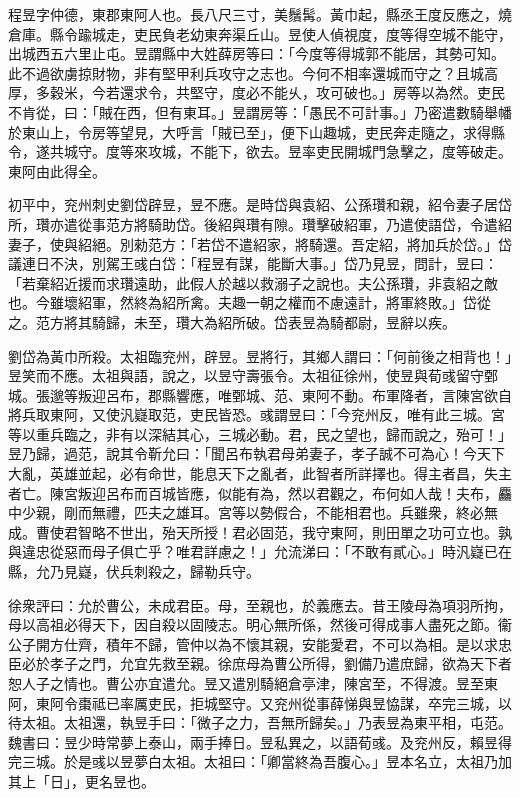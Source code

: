 
\begin{pinyinscope}
程昱字仲德，東郡東阿人也。長八尺三寸，美鬚髯。黃巾起，縣丞王度反應之，燒倉庫。縣令踰城走，吏民負老幼東奔渠丘山。昱使人偵視度，度等得空城不能守，出城西五六里止屯。昱謂縣中大姓薛房等曰：「今度等得城郭不能居，其勢可知。此不過欲虜掠財物，非有堅甲利兵攻守之志也。今何不相率還城而守之？且城高厚，多穀米，今若還求令，共堅守，度必不能乆，攻可破也。」房等以為然。吏民不肯從，曰：「賊在西，但有東耳。」昱謂房等：「愚民不可計事。」乃密遣數騎舉幡於東山上，令房等望見，大呼言「賊已至」，便下山趣城，吏民奔走隨之，求得縣令，遂共城守。度等來攻城，不能下，欲去。昱率吏民開城門急擊之，度等破走。東阿由此得全。

初平中，兖州刺史劉岱辟昱，昱不應。是時岱與袁紹、公孫瓚和親，紹令妻子居岱所，瓚亦遣從事范方將騎助岱。後紹與瓚有隙。瓚擊破紹軍，乃遣使語岱，令遣紹妻子，使與紹絕。別勑范方：「若岱不遣紹家，將騎還。吾定紹，將加兵於岱。」岱議連日不決，別駕王彧白岱：「程昱有謀，能斷大事。」岱乃見昱，問計，昱曰：「若棄紹近援而求瓚遠助，此假人於越以救溺子之說也。夫公孫瓚，非袁紹之敵也。今雖壞紹軍，然終為紹所禽。夫趣一朝之權而不慮遠計，將軍終敗。」岱從之。范方將其騎歸，未至，瓚大為紹所破。岱表昱為騎都尉，昱辭以疾。

劉岱為黃巾所殺。太祖臨兖州，辟昱。昱將行，其鄉人謂曰：「何前後之相背也！」昱笑而不應。太祖與語，說之，以昱守壽張令。太祖征徐州，使昱與荀彧留守鄄城。張邈等叛迎呂布，郡縣響應，唯鄄城、范、東阿不動。布軍降者，言陳宮欲自將兵取東阿，又使汎嶷取范，吏民皆恐。彧謂昱曰：「今兖州反，唯有此三城。宮等以重兵臨之，非有以深結其心，三城必動。君，民之望也，歸而說之，殆可！」昱乃歸，過范，說其令靳允曰：「聞呂布執君母弟妻子，孝子誠不可為心！今天下大亂，英雄並起，必有命世，能息天下之亂者，此智者所詳擇也。得主者昌，失主者亡。陳宮叛迎呂布而百城皆應，似能有為，然以君觀之，布何如人哉！夫布，麤中少親，剛而無禮，匹夫之雄耳。宮等以勢假合，不能相君也。兵雖衆，終必無成。曹使君智略不世出，殆天所授！君必固范，我守東阿，則田單之功可立也。孰與違忠從惡而母子俱亡乎？唯君詳慮之！」允流涕曰：「不敢有貳心。」時汎嶷已在縣，允乃見嶷，伏兵刺殺之，歸勒兵守。

徐衆評曰：允於曹公，未成君臣。母，至親也，於義應去。昔王陵母為項羽所拘，母以高祖必得天下，因自殺以固陵志。明心無所係，然後可得成事人盡死之節。衞公子開方仕齊，積年不歸，管仲以為不懷其親，安能愛君，不可以為相。是以求忠臣必於孝子之門，允宜先救至親。徐庶母為曹公所得，劉備乃遣庶歸，欲為天下者恕人子之情也。曹公亦宜遣允。昱又遣別騎絕倉亭津，陳宮至，不得渡。昱至東阿，東阿令棗祗已率厲吏民，拒城堅守。又兖州從事薛悌與昱恊謀，卒完三城，以待太祖。太祖還，執昱手曰：「微子之力，吾無所歸矣。」乃表昱為東平相，屯范。魏書曰：昱少時常夢上泰山，兩手捧日。昱私異之，以語荀彧。及兖州反，賴昱得完三城。於是彧以昱夢白太祖。太祖曰：「卿當終為吾腹心。」昱本名立，太祖乃加其上「日」，更名昱也。


\end{pinyinscope}
